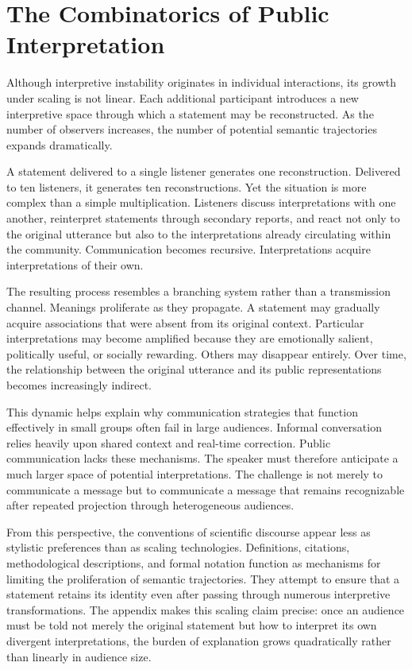 \documentclass[11pt]{article}
\theoremstyle{plain}
\begin{document}
\section{The Combinatorics of Public Interpretation}

Although interpretive instability originates in individual interactions, its growth under scaling is not linear. Each additional participant introduces a new interpretive space through which a statement may be reconstructed. As the number of observers increases, the number of potential semantic trajectories expands dramatically.

A statement delivered to a single listener generates one reconstruction. Delivered to ten listeners, it generates ten reconstructions. Yet the situation is more complex than a simple multiplication. Listeners discuss interpretations with one another, reinterpret statements through secondary reports, and react not only to the original utterance but also to the interpretations already circulating within the community. Communication becomes recursive. Interpretations acquire interpretations of their own.

The resulting process resembles a branching system rather than a transmission channel. Meanings proliferate as they propagate. A statement may gradually acquire associations that were absent from its original context. Particular interpretations may become amplified because they are emotionally salient, politically useful, or socially rewarding. Others may disappear entirely. Over time, the relationship between the original utterance and its public representations becomes increasingly indirect.

This dynamic helps explain why communication strategies that function effectively in small groups often fail in large audiences. Informal conversation relies heavily upon shared context and real-time correction. Public communication lacks these mechanisms. The speaker must therefore anticipate a much larger space of potential interpretations. The challenge is not merely to communicate a message but to communicate a message that remains recognizable after repeated projection through heterogeneous audiences.

From this perspective, the conventions of scientific discourse appear less as stylistic preferences than as scaling technologies. Definitions, citations, methodological descriptions, and formal notation function as mechanisms for limiting the proliferation of semantic trajectories. They attempt to ensure that a statement retains its identity even after passing through numerous interpretive transformations. The appendix makes this scaling claim precise: once an audience must be told not merely the original statement but how to interpret its own divergent interpretations, the burden of explanation grows quadratically rather than linearly in audience size.
\end{document}
